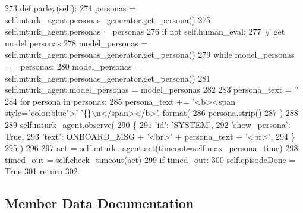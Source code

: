 \begin{DoxyCode}
273     \textcolor{keyword}{def }parley(self):
274         personas = self.mturk\_agent.personas\_generator.get\_persona()
275         self.mturk\_agent.personas = personas
276         \textcolor{keywordflow}{if} \textcolor{keywordflow}{not} self.human\_eval:
277             \textcolor{comment}{# get model personas}
278             model\_personas = self.mturk\_agent.personas\_generator.get\_persona()
279             \textcolor{keywordflow}{while} model\_personas == personas:
280                 model\_personas = self.mturk\_agent.personas\_generator.get\_persona()
281             self.mturk\_agent.model\_personas = model\_personas
282 
283         persona\_text = \textcolor{stringliteral}{''}
284         \textcolor{keywordflow}{for} persona \textcolor{keywordflow}{in} personas:
285             persona\_text += \textcolor{stringliteral}{'<b><span style="color:blue">'} \textcolor{stringliteral}{'\{\}\(\backslash\)n</span></b>'}.
      \hyperlink{namespaceparlai_1_1chat__service_1_1services_1_1messenger_1_1shared__utils_a32e2e2022b824fbaf80c747160b52a76}{format}(
286                 persona.strip()
287             )
288 
289         self.mturk\_agent.observe(
290             \{
291                 \textcolor{stringliteral}{'id'}: \textcolor{stringliteral}{'SYSTEM'},
292                 \textcolor{stringliteral}{'show\_persona'}: \textcolor{keyword}{True},
293                 \textcolor{stringliteral}{'text'}: ONBOARD\_MSG + \textcolor{stringliteral}{'<br>'} + persona\_text + \textcolor{stringliteral}{'<br>'},
294             \}
295         )
296 
297         act = self.mturk\_agent.act(timeout=self.max\_persona\_time)
298         timed\_out = self.check\_timeout(act)
299         \textcolor{keywordflow}{if} timed\_out:
300             self.episodeDone = \textcolor{keyword}{True}
301             \textcolor{keywordflow}{return}
302 
\end{DoxyCode}


\subsection{Member Data Documentation}
\mbox{\label{classprojects_1_1controllable__dialogue_1_1mturk_1_1worlds_1_1PersonaAssignWorld_a4820af5d7a4d448167b669d2b9a1a0ac}} 
